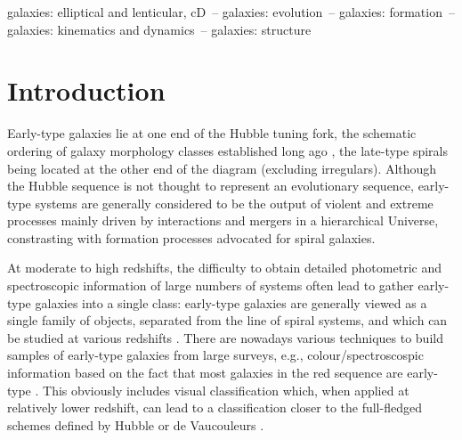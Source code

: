 \documentclass[useAMS,usenatbib,usegraphicx]{mn2e}
\begin{document}
\begin{abstract}
Fast and Slow Rotators illustrate the variety of complex processes shaping galactic systems, such as e.g., secular evolution, disc instabilities, interaction and merging, gas accretion, stripping and harassment, forming a sequence from high to low (stellar) baryonic angular momentum. Massive Slow Rotators represent the extreme instances within the red sequence of galaxies which might have suffered from significant merging without being able to rebuild a fast rotating component within one effective radius. We therefore argue for a shift in the paradigm for early-type galaxies, where the vast majority of ETGs are galaxies consistent with nearly oblate systems (with or without bars), and where only a small fraction of them (less than 12\%) have central (mildly) triaxial structures.
\end{abstract}
%
\begin{keywords}
galaxies: elliptical and lenticular, cD~--
galaxies: evolution~-- 
galaxies: formation~-- 
galaxies: kinematics and dynamics~-- 
galaxies: structure
\end{keywords}

\section{Introduction\label{sec:intro}}

Early-type galaxies lie at one end of the Hubble tuning fork, the schematic ordering of
galaxy morphology classes established long ago \citep{Hubble36, RC3}, the late-type
spirals being located at the other end of the diagram (excluding irregulars).
Although the Hubble sequence is not thought to represent an evolutionary sequence,
early-type systems are generally considered to be the output of
violent and extreme processes mainly driven by interactions and mergers in a
hierarchical Universe, constrasting with formation processes advocated for
spiral galaxies.

At moderate to high redshifts, the difficulty to obtain detailed photometric and spectroscopic 
information of large numbers of systems often lead to gather early-type galaxies into a single class: 
early-type galaxies are generally viewed as a single family of objects,
separated from the line of spiral systems, and which can
be studied at various redshifts \citep[e.g.][]{Bell+04, McIntosh+05, Kriek+08}.
There are nowadays various techniques to build samples of early-type
galaxies from large surveys, e.g., colour/spectroscospic information based on 
the fact that most galaxies in the red sequence are early-type 
\cite[see e.g.][and references therein]{Bell+04}. This obviously includes visual 
classification which, when applied at relatively lower redshift,
can lead to a classification closer to the full-fledged schemes defined by Hubble or de
Vaucouleurs \citep{Fukugita+07}. 
\end{document}
